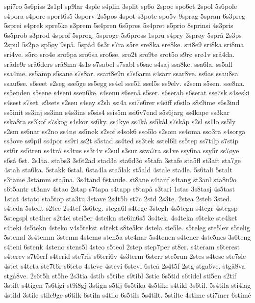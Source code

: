 {spi7ro
5s6piss
2s1pl
sp9lar
4sple
s4plin
3split
sp6o
2spoe
spo6et
2spol
5s6pole
s4pora
s4pore
sport6s5
3sporv
2s5pos
4spot
s3pote
spo5v
9sprag
5spran
6s3preg
5sprei
s4prek
spre5ke
s3prem
5s4pren
6s5pres
5s4pret
s5prio
8sprinsi
4s3pris
6s5prob
s3prod
4sprof
5sprog.
5sproge
5s6pross
1spru
s4pry
3spr^^f8y
5spr^^e5
2s3ps
2spul
5s2p^^f8
sp5^^f8y
9sp^^e5.
5sp^^e5d
6s3r
s7ra
s5re
sre8ka
sre8ke.
sri8e9
sri8ka
sri8ma
sri4ve.
s5ro
sro4e
sro6pa
sro6sa
sro6se.
sro2t
sro9te
srot5o
s9r^^f8
sr^^f81v
sr^^e54da.
sr^^e5de9r
sr^^e56ders
sr^^e58ma
4s1s
s7sabel
s7sabl
s6sae
s4saj
ssa8ke.
ssa6la.
ss5all
ssa4me.
ss5amp
s5sane
s7s8ar.
ssari8e9n
s7s6arm
s4sarr
ssar8ve.
ss6as
ssau8sa
ssau6se.
s6seet
s2seg
sse5ge
ss5egg
ss4el
sse5li
ssel5s
ss9elv.
s2sem
s5sen.
sse8na.
ss5enden
s5sene
s4seni
ssen6ke.
s4senu
s6sen^^e5
s5ser.
s6serab
s6serat
sse7sk
s4seski
s4sest
s7set.
s9sets
s2seu
s4sey
s2sh
ssi4a
ssi7e6rer
s4siff
s6silo
s8s9ime
s6s3ind
ss5init
ss3inj
ss3inn
s4s3ins
s5sis4
ssis5m
ssi6v7end
s5s6jarg
ss4kape
ss3kar
sska8ra
ss3kof
s7skog
s4skor
ss6ky.
ss4kye
ss4k^^e5
ss5k^^e5l
s7sk^^e5p
s2sl
ss1lo
ss5ly
s2sm
ss6nar
ss2no
ss4n^^f8
ss5n^^f8k
s2sof
s4sok6
sso5lo
s2som
ss4oma
sso3ra
s4sorga
ss3ove
ss6pil
ss4por
ss9ri
ss2t
s5stad
ss4ted
ss3tek
sstel6li
ss5tep
ss7tilp
s7stip
sst6r
ss5tren
ss4tr^^e5
ss3tus
ss3t4v
s2sul
s3sur
ssva7ra
ss1ve
ssy6na
ssy5r
ss7^^f8ye
s6s^^e5
6st.
2s1ta.
stabs3
3s6t2ad
stad3a
sta6d3o
s5tafa
3stafe
sta5fl
st3aft
sta7ge
4stah
sta6ka.
5stakk
6stal.
6sta4la
sta5lak
st5ald
4stale
sta4le.
5s6tali
5stalt
s3tame
3stamm
sta5na.
3s4tand
6stande.
st8ane
s4tanf
s4tang
st3anl
sta8n9o
s6t5antr
st3anv
4stao
2stap
s7tapa
s4tapp
s8tap^^e5
s3tari
1stas
3s8tasj
4s5tast
1stat
4stato
sta5top
sta3tu
3stave
2s4t5b
st7c
2std
2s3te.
2stea
2steb
3sted.
s4teda
5stedt
s2tee
2s4tef
3s6teg.
stega6l
s4tege
3stegh
4s5tegn
s4tegr
4stegsp
5stegspl
ste4her
s2t4ei
stei5er
4steikn
ste6in6s5
3s4tek.
4s4teka
s6teke
ste4ket
s4teki
4s5tekn
4steko
v4s5tekst
s4tekt
s8te5kv
4stela
ste5le.
s5teleg
ste5lev
s5telig
5stemd
3s4temm
3stemn
4stem^^f8
sten5a
ste4nar
5s4tenen
s4tener
4ste5nes
3s6teng
s4teni
6stenk
4steno
stens5l
4steo
s5teol
2step
step7per
st8er.
s4teram
s6terest
s4terev
s7t6erf
s4terid
ste7ris
s6teri6v
4s3term
6sterr
ste5run
2stes
s4tese
ste7sle
4stet
s4teta
ste7t6r
s6tet^^f8
4steve
4stevi
6stevl
6ste^^e5
2s4t5f
2stg
stga6ve.
stg^^e58va
stg^^e58ve.
2s6t5h
st5he
2s3tia
4stib
s5tibe
s9tibl
3stic
6s5tid
s6tidel
sti5en
s2tif
3stift
s4tigen
7s6tigi
st9i8gj
3stign
s5tij
6s5tika
4s5tike
s4tikl
3s6til.
5s4tila
sti4lag
4stild
3stile
stile9ge
s6tilk
6stiln
s4tilo
6s5tils
5s4tilt.
5stilte
4stime
sti7mer
6stim^^e9
}
